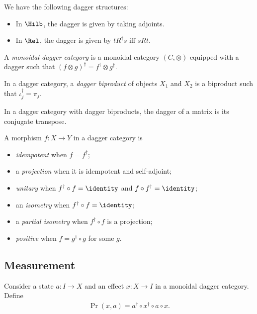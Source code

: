 \documentclass{article}
\begin{document}
\begin{example}
  We have the following dagger structures:
  \begin{itemize}
    \item In $\Hilb$, the dagger is given by taking adjoints.
    \item In $\Rel$, the dagger is given by $t R^\dagger s$ iff $s R t$.
  \end{itemize}
\end{example}

\begin{definition}
  A \emph{monoidal dagger category} is a monoidal category $(C,\otimes)$ equipped with
  a dagger such that $(f\otimes g)^\dagger = f^\dagger \otimes g^\dagger$.
\end{definition}

\begin{definition}
  In a dagger category, a \emph{dagger biproduct} of objects $X_1$ and $X_2$ is a biproduct
  such that $\iota_j^\dagger = \pi_j$.
\end{definition}

\begin{lemma}
  In a dagger category with dagger biproducts, the dagger of a matrix is its conjugate transpose.
\end{lemma}

\begin{definition}
  A morphism $f:X\to Y$ in a dagger category is
  \begin{itemize}
    \item \emph{idempotent} when $f=f^\dagger$;
    \item a \emph{projection} when it is idempotent and self-adjoint;
    \item \emph{unitary} when $f^\dagger \circ f = \identity$ and $f\circ f^\dagger=\identity$;
    \item an \emph{isometry} when $f^\dagger \circ f=\identity$;
    \item a \emph{partial isometry} when $f^\dagger\circ f$ is a projection;
    \item \emph{positive} when $f=g^\dagger\circ g$ for some $g$.
  \end{itemize}
\end{definition}

\subsection{Measurement}

\begin{definition}
  Consider a state $a : I\to X$ and an effect $x : X\to I$ in a monoidal dagger category.
  Define
  \begin{align*}
    \Pr(x,a) = a^\dagger \circ x^\dagger \circ a\circ x.
  \end{align*}
\end{definition}
\end{document}
